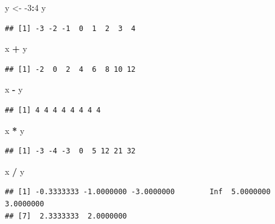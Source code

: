 \documentclass[]{book}
\newenvironment{Shaded}{\begin{snugshade}}{\end{snugshade}}
\newcommand{\DecValTok}[1]{\textcolor[rgb]{0.00,0.00,0.81}{#1}}
\newcommand{\NormalTok}[1]{#1}
\newcommand{\OperatorTok}[1]{\textcolor[rgb]{0.81,0.36,0.00}{\textbf{#1}}}
\newcommand{\StringTok}[1]{\textcolor[rgb]{0.31,0.60,0.02}{#1}}
\theoremstyle{definition}
\theoremstyle{definition}
\theoremstyle{definition}
\theoremstyle{remark}
\begin{document}
\begin{Shaded}
\begin{Highlighting}[]
\NormalTok{y <-}\StringTok{ }\DecValTok{-3}\OperatorTok{:}\DecValTok{4}
\NormalTok{y}
\end{Highlighting}
\end{Shaded}

\begin{verbatim}
## [1] -3 -2 -1  0  1  2  3  4
\end{verbatim}

\begin{Shaded}
\begin{Highlighting}[]
\NormalTok{x }\OperatorTok{+}\StringTok{ }\NormalTok{y}
\end{Highlighting}
\end{Shaded}

\begin{verbatim}
## [1] -2  0  2  4  6  8 10 12
\end{verbatim}

\begin{Shaded}
\begin{Highlighting}[]
\NormalTok{x }\OperatorTok{-}\StringTok{ }\NormalTok{y}
\end{Highlighting}
\end{Shaded}

\begin{verbatim}
## [1] 4 4 4 4 4 4 4 4
\end{verbatim}

\begin{Shaded}
\begin{Highlighting}[]
\NormalTok{x }\OperatorTok{*}\StringTok{ }\NormalTok{y}
\end{Highlighting}
\end{Shaded}

\begin{verbatim}
## [1] -3 -4 -3  0  5 12 21 32
\end{verbatim}

\begin{Shaded}
\begin{Highlighting}[]
\NormalTok{x }\OperatorTok{/}\StringTok{ }\NormalTok{y}
\end{Highlighting}
\end{Shaded}

\begin{verbatim}
## [1] -0.3333333 -1.0000000 -3.0000000        Inf  5.0000000  3.0000000
## [7]  2.3333333  2.0000000
\end{verbatim}
\end{document}
